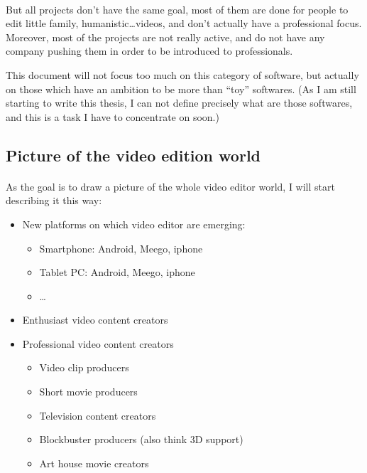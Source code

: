     \paragraph{}
        But all projects don't have the same goal, most of them are
        done for people to edit little family, humanistic\ldots videos,
        and don't actually have a professional focus. Moreover, most of the
        projects are not really active, and do not have any company pushing them
        in order to be introduced to professionals.

        This document will not focus too much on this category of software, but
        actually on those which have an ambition to be more than ``toy''
        softwares. (As I am still starting to write this thesis, I can not define
        precisely what are those softwares, and this is a task I have to
        concentrate on soon.)


    \subsection*{Picture of the video edition world}
        \paragraph{}
            As the goal is to draw a picture of the whole video editor world, I
            will start describing it this way:
            \begin {itemize}
                \item {New platforms on which video editor are emerging:}
                \begin {itemize}
                    \item {Smartphone: Android, Meego, iphone}
                    \item {Tablet PC: Android, Meego, iphone}
                    \item {\ldots}
                \end {itemize}
                \item {Enthusiast video content creators}
                \item {Professional video content creators}
                \begin {itemize}
                    \item {Video clip producers}
                    \item {Short movie producers}
                    \item {Television content creators}
                    \item {Blockbuster producers (also think 3D support)}
                    \item {Art house movie creators}
                \end {itemize}
            \end {itemize}

